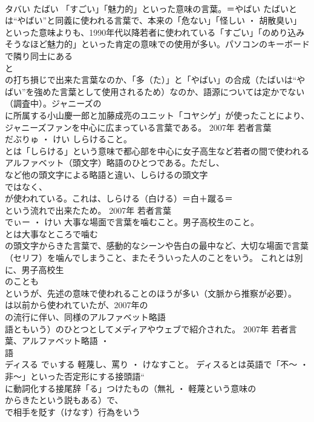 \documentclass[8pt]{extreport}
\begin{document}
\begin{CJK}{UTF8}{min}
\\	タバい	たばい	「すごい」「魅力的」といった意味の言葉。＝やばい	たばいとは“やばい”と同義に使われる言葉で、本来の「危ない」「怪しい ・ 胡散臭い」といった意味よりも、1990年代以降若者に使われている「すごい」「のめり込みそうなほど魅力的」といった肯定の意味での使用が多い。パソコンのキーボードで隣り同士にある
\\	と
\\	の打ち損じで出来た言葉なのか、「多（た）」と「やばい」の合成（たばいは“やばい”を強めた言葉として使用されるため）なのか、語源については定かでない（調査中）。ジャニーズの
\\	に所属する小山慶一郎と加藤成亮のユニット「コヤシゲ」が使ったことにより、ジャニーズファンを中心に広まっている言葉である。	2007年	若者言葉	
\\	だぶりゅ ・ けい	しらけること。	
\\	とは「しらける」という意味で都心部を中心に女子高生など若者の間で使われるアルファベット（頭文字）略語のひとつである。ただし、
\\	など他の頭文字による略語と違い、しらけるの頭文字
\\	ではなく、
\\	が使われている。これは、しらける（白ける）＝白＋蹴る＝
\\	という流れで出来たため。	2007年	若者言葉	
\\	でぃー ・ けい	大事な場面で言葉を噛むこと。男子高校生のこと。	
\\	とは大事なところで噛む
\\	の頭文字からきた言葉で、感動的なシーンや告白の最中など、大切な場面で言葉（セリフ）を噛んでしまうこと、またそういった人のことをいう。 これとは別に、男子高校生
\\	のことも
\\	というが、先述の意味で使われることのほうが多い（文脈から推察が必要）。 
\\	は以前から使われていたが、2007年の
\\	の流行に伴い、同様のアルファベット略語
\\	語ともいう）のひとつとしてメディアやウェブで紹介された。	2007年	若者言葉、アルファベット略語 ・ 
\\	語	
\\	ディスる	でぃする	軽蔑し、罵り ・ けなすこと。	ディスるとは英語で「不～ ・ 非～」といった否定形にする接頭語“
\\	に動詞化する接尾辞「る」つけたもの（無礼 ・ 軽蔑という意味の
\\	からきたという説もある）で、
\\	で相手を貶す（けなす）行為をいう

\end{CJK}
\end{document}
